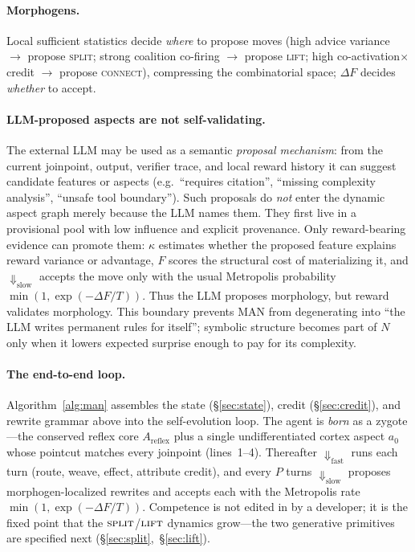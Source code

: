 \documentclass[11pt]{article}
\theoremstyle{definition}
\begin{document}
\paragraph{Morphogens.}
Local sufficient statistics decide \emph{where} to propose moves
(high advice variance $\to$ propose \textsc{split}; strong coalition
co-firing $\to$ propose \textsc{lift}; high co-activation$\times$credit $\to$
propose \textsc{connect}), compressing the combinatorial space; $\Delta F$
decides \emph{whether} to accept.

\paragraph{LLM-proposed aspects are not self-validating.}
The external LLM may be used as a semantic \emph{proposal mechanism}: from
the current joinpoint, output, verifier trace, and local reward history it can
suggest candidate features or aspects (e.g.\ ``requires citation'',
``missing complexity analysis'', ``unsafe tool boundary''). Such proposals do
\emph{not} enter the dynamic aspect graph merely because the LLM names them.
They first live in a provisional pool with low influence and explicit
provenance. Only reward-bearing evidence can promote them: $\kappa$ estimates
whether the proposed feature explains reward variance or advantage, $F$ scores
the structural cost of materializing it, and $\Downarrow_\text{slow}$ accepts
the move only with the usual Metropolis probability
$\min(1,\exp(-\Delta F/T))$. Thus the LLM proposes morphology, but reward
validates morphology. This boundary prevents MAN from degenerating into
``the LLM writes permanent rules for itself''; symbolic structure becomes part
of $N$ only when it lowers expected surprise enough to pay for its complexity.

\paragraph{The end-to-end loop.}
Algorithm~\ref{alg:man} assembles the state (\S\ref{sec:state}), credit
(\S\ref{sec:credit}), and rewrite grammar above into the self-evolution loop.
The agent is \emph{born} as a zygote---the conserved reflex core
$A_\text{reflex}$ plus a single undifferentiated cortex aspect $a_0$ whose
pointcut matches every joinpoint (lines~1--4). Thereafter $\Downarrow_\text{fast}$
runs each turn (route, weave, effect, attribute credit), and every $P$ turns
$\Downarrow_\text{slow}$ proposes morphogen-localized rewrites and accepts each
with the Metropolis rate $\min(1,\exp(-\Delta F/T))$. Competence is not edited
in by a developer; it is the fixed point that the
$\textsc{split}$/$\textsc{lift}$ dynamics grow---the two generative primitives
are specified next (\S\ref{sec:split},~\S\ref{sec:lift}).
\end{document}
